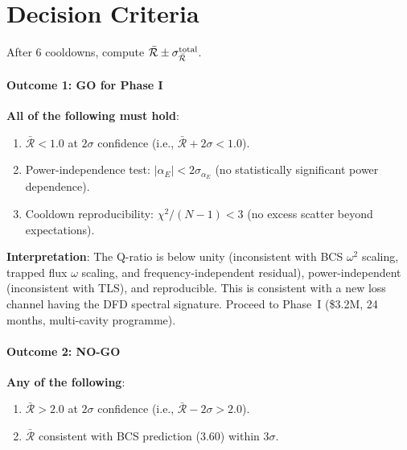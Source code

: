 \documentclass[11pt]{article}
\theoremstyle{definition}
\theoremstyle{remark}
\begin{document}
\part{Decision Criteria}
\label{sec:decision}


\begin{tcolorbox}[colback=green!5!white, colframe=green!60!black,
  title=\textbf{PHASE 0a DECISION FRAMEWORK}, breakable]

After 6 cooldowns, compute $\bar{\mathcal{R}} \pm
\sigma_{\bar{\mathcal{R}}}^{\rm total}$.

\subsection*{Outcome 1: GO for Phase I}

\textbf{All of the following must hold}:
\begin{enumerate}[nosep, label=(\roman*)]
\item $\bar{\mathcal{R}} < 1.0$ at $2\sigma$ confidence
  (i.e., $\bar{\mathcal{R}} + 2\sigma < 1.0$).
\item Power-independence test: $|\alpha_E| < 2\sigma_{\alpha_E}$
  (no statistically significant power dependence).
\item Cooldown reproducibility: $\chi^2/(N-1) < 3$ (no excess scatter
  beyond expectations).
\end{enumerate}

\textbf{Interpretation}: The Q-ratio is below unity (inconsistent
with BCS $\omega^2$ scaling, trapped flux $\omega$ scaling, and
frequency-independent residual), power-independent (inconsistent
with TLS), and reproducible. This is consistent with a new loss
channel having the DFD spectral signature. Proceed to Phase~I
(\$3.2M, 24 months, multi-cavity programme).

\subsection*{Outcome 2: NO-GO}

\textbf{Any of the following}:
\begin{enumerate}[nosep, label=(\roman*)]
\item $\bar{\mathcal{R}} > 2.0$ at $2\sigma$ confidence
  (i.e., $\bar{\mathcal{R}} - 2\sigma > 2.0$).
\item $\bar{\mathcal{R}}$ consistent with BCS prediction (3.60)
  within $3\sigma$.
\end{enumerate}


\end{tcolorbox}
\end{document}
